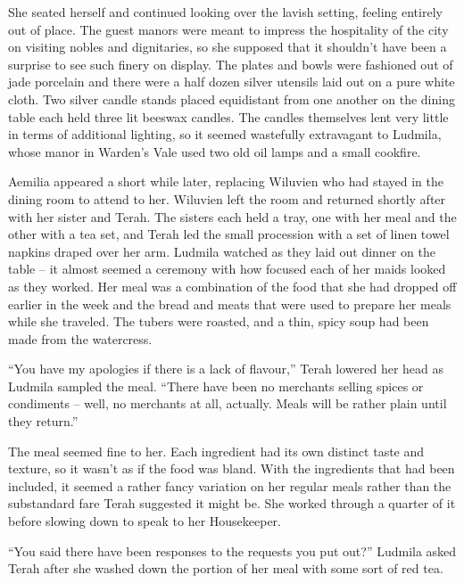  

She seated herself and continued looking over the lavish setting, feeling entirely out of place. The guest manors were meant to impress the hospitality of the city on visiting nobles and dignitaries, so she supposed that it shouldn’t have been a surprise to see such finery on display. The plates and bowls were fashioned out of jade porcelain and there were a half dozen silver utensils laid out on a pure white cloth. Two silver candle stands placed equidistant from one another on the dining table each held three lit beeswax candles. The candles themselves lent very little in terms of additional lighting, so it seemed wastefully extravagant to Ludmila, whose manor in Warden’s Vale used two old oil lamps and a small cookfire.

 

Aemilia appeared a short while later, replacing Wiluvien who had stayed in the dining room to attend to her. Wiluvien left the room and returned shortly after with her sister and Terah. The sisters each held a tray, one with her meal and the other with a tea set, and Terah led the small procession with a set of linen towel napkins draped over her arm. Ludmila watched as they laid out dinner on the table – it almost seemed a ceremony with how focused each of her maids looked as they worked. Her meal was a combination of the food that she had dropped off earlier in the week and the bread and meats that were used to prepare her meals while she traveled. The tubers were roasted, and a thin, spicy soup had been made from the watercress.

 

“You have my apologies if there is a lack of flavour,” Terah lowered her head as Ludmila sampled the meal. “There have been no merchants selling spices or condiments – well, no merchants at all, actually. Meals will be rather plain until they return.”

 

The meal seemed fine to her. Each ingredient had its own distinct taste and texture, so it wasn’t as if the food was bland. With the ingredients that had been included, it seemed a rather fancy variation on her regular meals rather than the substandard fare Terah suggested it might be. She worked through a quarter of it before slowing down to speak to her Housekeeper.

 

“You said there have been responses to the requests you put out?” Ludmila asked Terah after she washed down the portion of her meal with some sort of red tea.

